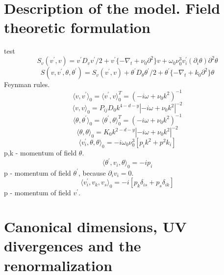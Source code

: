 \documentclass[12pt]{article}
\begin{document}

\section{Description of the model. Field theoretic formulation}
test
\label{sec:QFT}
\begin{equation}
    S_{v}(v^{'},v)=v^{'}D_{v}v^{'}/2+v^{'}\{-\nabla_{t}+\nu_{0}\partial^2\}v+\omega_{0}\nu_{0}^{3}v^{'}_{i}(\partial_{i}\theta)\partial^{2}\theta
\end{equation}
\begin{equation}
S(v,v^{'},\theta,\theta^{'}) = S_{v}(v^{'},v)+\theta^{'}D_{\theta}\theta^{'}/2+\theta^{'}\{-\nabla_{t}+k_{0}\partial^{2}\}\theta
\end{equation}
Feynman rules.
\begin{equation}
\langle v,v^{'} \rangle_{0}=\langle v^{'},v \rangle _{0}^{T}=(-i\omega+\nu_{0}k^2)^{-1}
\end{equation}
\begin{equation}
\langle v,v \rangle_{0}=P_{ij}D_{0}k^{4-d-y}|-i\omega+\nu_{0}k^2|^{-2}
\end{equation}
\begin{equation}
\langle \theta,\theta^{'} \rangle_{0}=\langle \theta^{'},\theta \rangle _{0}^{T}=(-i\omega+\nu_{0}k^2)^{-1}
\end{equation}
\begin{equation}
\langle \theta,\theta \rangle_{0}=K_{0}k^{2-d-y}|-i\omega+\nu_{0}k^2|^{-2}
\end{equation}
\begin{equation}
    \langle v_{i}^{'}, \theta,\theta \rangle_{0}= -i\omega_{0}\nu_{0}^{3}[p_i k^2+p^2 k_i]
\end{equation}
p,k - momentum of field $\theta$.
\begin{equation}
\langle \theta^{'}, v_i ,\theta \rangle_{0}= -ip_i
\end{equation}
p - momentum of field $\theta^{'}$, because $\partial_i v_i=0$.
\begin{equation}
\langle v^{'}_i, v_k ,v_s \rangle_{0}= -i[p_k \delta_{is}+ p_s \delta_{ik}]
\end{equation}
p - momentum of field $v^{'}$.
\section{Canonical dimensions, UV divergences and the renormalization}
\label{sec:Reno}
\end{document}
